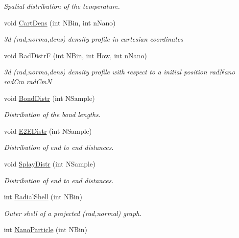 \begin{DoxyCompactItemize}
\begin{DoxyCompactList}\small\item\em Spatial distribution of the temperature. \end{DoxyCompactList}\item 
void \hyperlink{classElPoly_ac946a8b29f4eec0816699ce0c0cac23c}{Cart\+Dens} (int N\+Bin, int n\+Nano)
\begin{DoxyCompactList}\small\item\em 3d (rad,norma,dens) density profile in cartesian coordinates \end{DoxyCompactList}\item 
void \hyperlink{classElPoly_aff852b942203d47f2e21e2616537cbdd}{Rad\+DistrF} (int N\+Bin, int How, int n\+Nano)
\begin{DoxyCompactList}\small\item\em 3d (rad,norma,dens) density profile with respect to a initial position  rad\+Nano rad\+Cm rad\+CmN \end{DoxyCompactList}\item 
void \hyperlink{classElPoly_a932a57ab32bd20f60bce8b498ca3095d}{Bond\+Distr} (int N\+Sample)
\begin{DoxyCompactList}\small\item\em Distribution of the bond lengths. \end{DoxyCompactList}\item 
void \hyperlink{classElPoly_adac974d49c2d38f45c0227afe7c8fec9}{E2\+E\+Distr} (int N\+Sample)\hypertarget{classElPoly_adac974d49c2d38f45c0227afe7c8fec9}{}\label{classElPoly_adac974d49c2d38f45c0227afe7c8fec9}

\begin{DoxyCompactList}\small\item\em Distribution of end to end distances. \end{DoxyCompactList}\item 
void \hyperlink{classElPoly_aab448d2a574f63977ddcacb58db616e1}{Splay\+Distr} (int N\+Sample)
\begin{DoxyCompactList}\small\item\em Distribution of end to end distances. \end{DoxyCompactList}\item 
int \hyperlink{classElPoly_a64e019ffaa4437477ea433f7b5113341}{Radial\+Shell} (int N\+Bin)\hypertarget{classElPoly_a64e019ffaa4437477ea433f7b5113341}{}\label{classElPoly_a64e019ffaa4437477ea433f7b5113341}

\begin{DoxyCompactList}\small\item\em Outer shell of a projected (rad,normal) graph. \end{DoxyCompactList}\item 
int \hyperlink{classElPoly_af9a89c5f8dc4c7274ec5e00ff4db78bb}{Nano\+Particle} (int N\+Bin)\hypertarget{classElPoly_af9a89c5f8dc4c7274ec5e00ff4db78bb}{}\label{classElPoly_af9a89c5f8dc4c7274ec5e00ff4db78bb}


\end{DoxyCompactItemize}
